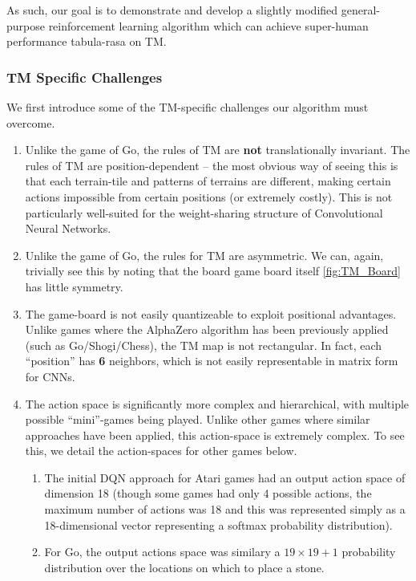 \documentclass[12pt,twocolumn,letterpaper]{article}
\begin{document}
As such, our goal is to demonstrate and develop a slightly modified general-purpose reinforcement learning algorithm which can achieve super-human performance tabula-rasa on TM.

\subsubsection{TM Specific Challenges}
\label{subsubsection:tm_specific_challenges}
We first introduce some of the TM-specific challenges our algorithm must overcome.

\begin{enumerate}
    \item Unlike the game of Go, the rules of TM are \textbf{not} translationally invariant. The rules of TM are position-dependent -- the most obvious way of seeing this is that each terrain-tile and patterns of terrains are different, making certain actions impossible from certain positions (or extremely costly). This is not particularly well-suited for the weight-sharing structure of Convolutional Neural Networks.
    \item Unlike the game of Go, the rules for TM are asymmetric. We can, again, trivially see this by noting that the board game board itself \ref{fig:TM_Board} has little symmetry.
    \item The game-board is not easily quantizeable to exploit positional advantages. Unlike games where the AlphaZero algorithm has been previously applied (such as Go/Shogi/Chess), the TM map is not rectangular. In fact, each ``position'' has \textbf{6} neighbors, which is not easily representable in matrix form for CNNs.
    \item The action space is significantly more complex and hierarchical, with multiple possible ``mini''-games being played. Unlike other games where similar approaches have been applied, this action-space is extremely complex. To see this, we detail the action-spaces for other games below.
    \begin{enumerate}
        \item The initial DQN approach for Atari games had an output action space of dimension 18 (though some games had only 4 possible actions, the maximum number of actions was 18 and this was represented simply as a 18-dimensional vector representing a softmax
        probability distribution).
        \item For Go, the output actions space was similary a $19\times19 + 1$ probability distribution over the locations on which to place a stone. 

\end{enumerate}
\end{enumerate}
\end{document}

